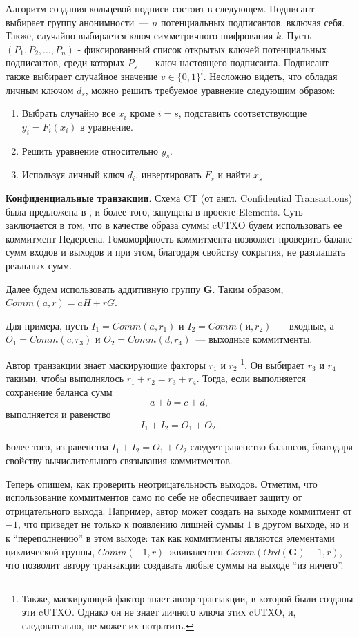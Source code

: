 \documentclass{article}
\begin{document}
Алгоритм создания кольцевой подписи состоит в следующем.
Подписант выбирает группу анонимности~--- $n$ потенциальных подписантов,
включая себя.
Также, случайно выбирается ключ симметричного шифрования $k$.
Пусть $(P_1, P_2, \ldots, P_{n})$ - фиксированный список открытых ключей
потенциальных подписантов, среди которых $P_s$~--- ключ настоящего подписанта.
Подписант также выбирает случайное значение $v\in \{0, 1\}^l$.
Несложно видеть, что обладая личным ключом $d_s$,
можно решить требуемое уравнение следующим образом:
\begin{enumerate}
  \item
  Выбрать случайно все $x_i$ кроме $i=s$, подставить соответствующие $y_i = F_i(x_i)$
  в уравнение.
  \item
  Решить уравнение относительно $y_s$.
  \item
  Используя личный ключ $d_i$, инвертировать $F_s$ и найти $x_s$.
\end{enumerate}

{\bf Конфиденциальные транзакции}.
Схема CT (от англ. Confidential Transactions)
 была предложена в \cite{ct}, и более того, запущена в проекте Elements.
Суть заключается в том, что в качестве образа суммы cUTXO будем использовать ее коммитмент Педерсена.
Гомоморфность коммитмента позволяет проверить баланс сумм входов и выходов и
при этом, благодаря свойству сокрытия, не разглашать реальных сумм.


Далее будем использовать аддитивную группу $\mathbf{G}$.
Таким образом, $Comm(a,r) = aH + rG$.


Для примера, пусть $I_1 = Comm(a, r_1)$ и $I_2 = Comm(и, r_2)$~--- входные,
а $O_1 = Comm(c, r_3)$ и $O_2 = Comm(d, r_4)$~--- выходные коммитменты.

Автор транзакции знает маскирующие факторы $r_1$ и $r_2$
\footnote{Также, маскирующий фактор знает автор транзакции, в которой были созданы эти cUTXO.
Однако он не знает личного ключа этих cUTXO, и, следовательно, не может их потратить. }.
Он выбирает $r_3$ и $r_4$ такими, чтобы выполнялось $r_1 + r_2 = r_3 + r_4$.
Тогда, если выполняется сохранение баланса сумм
$$a + b = c + d,$$
выполняется и равенство
$$
I_1 + I_2 = O_1 + O_2.
$$

Более того, из равенства $I_1 + I_2 = O_1 + O_2$ следует равенство балансов,
благодаря свойству вычислительного связывания коммитментов.

Теперь опишем, как проверить неотрицательность выходов.
Отметим, что использование коммитментов само по себе
не обеспечивает защиту от отрицательного выхода.
Например, автор может создать на выходе коммитмент от $-1$,
что приведет не только к появлению лишней суммы $1$ в другом выходе,
но и к ``переполнению'' в этом выходе: так как коммитменты являются
элементами циклической группы, $Comm(-1, r)$ эквивалентен $Comm(Ord(\mathbf{G}) - 1, r)$,
что позволит автору транзакции создавать любые суммы на выходе ``из ничего''.
\end{document}
